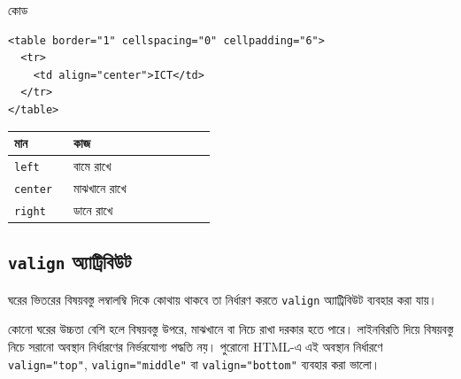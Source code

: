 \par\noindent
\begin{minipage}[t]{.52\linewidth}\vspace{0pt}\small
\begin{chFourWholeExample}{কোড}
\begin{verbatim}
<table border="1" cellspacing="0" cellpadding="6">
  <tr>
    <td align="center">ICT</td>
  </tr>
</table>
\end{verbatim}
\end{chFourWholeExample}
\end{minipage}\hfill
\begin{minipage}[t]{.44\linewidth}\vspace{0pt}\small
\begin{center}
\begin{tabular}{|p{0.25\linewidth}|p{0.60\linewidth}|}
\hline
\textbf{মান} & \textbf{কাজ} \\
\hline
\texttt{left} & বামে রাখে \\
\hline
\texttt{center} & মাঝখানে রাখে \\
\hline
\texttt{right} & ডানে রাখে \\
\hline
\end{tabular}
\end{center}
\end{minipage}\par\smallskip

\subsection{\texttt{valign} অ্যাট্রিবিউট}

ঘরের ভিতরের বিষয়বস্তু লম্বালম্বি দিকে কোথায় থাকবে তা নির্ধারণ করতে \texttt{valign} অ্যাট্রিবিউট ব্যবহার করা যায়।

কোনো ঘরের উচ্চতা বেশি হলে বিষয়বস্তু উপরে, মাঝখানে বা নিচে রাখা দরকার হতে পারে। লাইনবিরতি দিয়ে বিষয়বস্তু নিচে সরানো অবস্থান নির্ধারণের নির্ভরযোগ্য পদ্ধতি নয়। পুরোনো HTML-এ এই অবস্থান নির্ধারণে \texttt{valign="top"}, \texttt{valign="middle"} বা \texttt{valign="bottom"} ব্যবহার করা ভালো।

